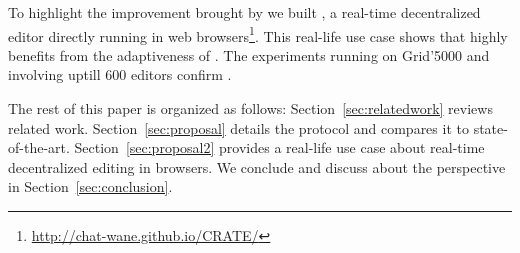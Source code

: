 To highlight the improvement brought by \SPRAY we built \CRATE, a real-time
decentralized editor directly running in web
browsers\footnote{\url{http://chat-wane.github.io/CRATE/}}. This real-life use
case shows that  highly benefits from the
adaptiveness of \SPRAY. The experiments running on Grid'5000 and involving
uptill 600 editors confirm .

The rest of this paper is organized as follows: Section~\ref{sec:relatedwork}
reviews related work. Section~\ref{sec:proposal} details the \SPRAY protocol and
compares it to state-of-the-art. Section~\ref{sec:proposal2} provides a
real-life use case about real-time decentralized editing in browsers. We
conclude and discuss about the perspective in Section~\ref{sec:conclusion}.

